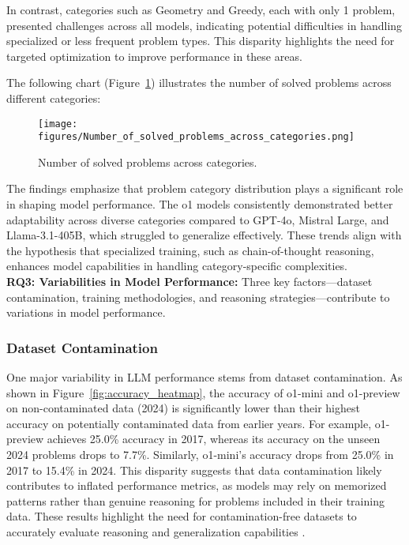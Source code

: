 In contrast, categories such as Geometry and Greedy, each with only 1 problem, presented challenges across all models, indicating potential difficulties in handling specialized or less frequent problem types. This disparity highlights the need for targeted optimization to improve performance in these areas.

The following chart (Figure~\ref{fig:category_trends}) illustrates the number of solved problems across different categories:

\begin{figure}[htbp]
    \centering
    \texttt{[image: figures/Number\_of\_solved\_problems\_across\_categories.png]}
    \caption{Number of solved problems across categories.}
    \label{fig:category_trends}
\end{figure}

The findings emphasize that problem category distribution plays a significant role in shaping model performance. The o1 models consistently demonstrated better adaptability across diverse categories compared to GPT-4o, Mistral Large, and Llama-3.1-405B, which struggled to generalize effectively. These trends align with the hypothesis that specialized training, such as chain-of-thought reasoning, enhances model capabilities in handling category-specific complexities.
\\
\textbf{RQ3: Variabilities in Model Performance:} Three key factors—dataset contamination, training methodologies, and reasoning strategies—contribute to variations in model performance.
\subsubsection{Dataset Contamination}
One major variability in LLM performance stems from dataset contamination. As shown in Figure~\ref{fig:accuracy_heatmap}, the accuracy of o1-mini and o1-preview on non-contaminated data (2024) is significantly lower than their highest accuracy on potentially contaminated data from earlier years. For example, o1-preview achieves 25.0\% accuracy in 2017, whereas its accuracy on the unseen 2024 problems drops to 7.7\%. Similarly, o1-mini's accuracy drops from 25.0\% in 2017 to 15.4\% in 2024. This disparity suggests that data contamination likely contributes to inflated performance metrics, as models may rely on memorized patterns rather than genuine reasoning for problems included in their training data. These results highlight the need for contamination-free datasets to accurately evaluate reasoning and generalization capabilities \cite{b1, b27}.

